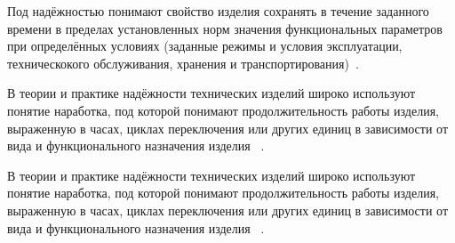 Под надёжностью понимают свойство изделия сохранять в течение
заданного времени в пределах установленных норм значения
функциональных параметров при определённых условиях (заданные режимы и
условия эксплуатации, техническокого обслуживания, хранения и
транспортирования)~\cite{Borovikov2010}.

В теории и практике надёжности технических изделий широко используют
понятие наработка, под которой понимают продолжительность работы
изделия, выраженную в часах, циклах переключения или других единиц в
зависимости от вида и функционального назначения изделия ~\cite{Borovikov2010}.

В теории и практике надёжности технических изделий широко используют
понятие наработка, под которой понимают продолжительность работы
изделия, выраженную в часах, циклах переключения или других единиц в
зависимости от вида и функционального назначения изделия ~\cite{Borovikov2010}.

